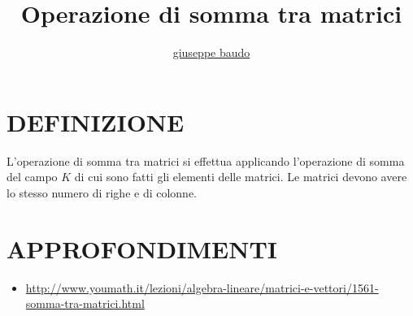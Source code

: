 \documentclass[a4paper,10pt]{article}
\title{Operazione di somma tra matrici}
\author{\href{http://www.baudo.hol.es}{giuseppe baudo}}
\begin{document}
\maketitle

\section{DEFINIZIONE}
L'operazione di somma tra matrici si effettua applicando l'operazione di somma del campo $K$ di cui sono fatti gli elementi delle matrici.
Le matrici devono avere lo stesso numero di righe e di colonne.

\section{APPROFONDIMENTI}
\begin{itemize}
 \item \url{http://www.youmath.it/lezioni/algebra-lineare/matrici-e-vettori/1561-somma-tra-matrici.html}
\end{itemize}
\end{document}
